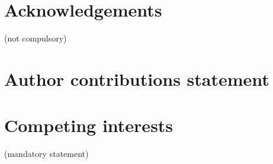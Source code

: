 \documentclass[fleqn,10pt]{wlscirep}
\begin{document}




\section*{Acknowledgements} (not compulsory)


\section*{Author contributions statement}


\section*{Competing interests} (mandatory statement)
\end{document}
